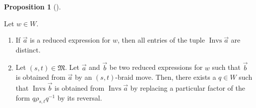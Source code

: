 \documentclass[numbers=enddot,12pt,final,onecolumn,notitlepage,abstracton]{scrartcl}%
\theoremstyle{definition}
\newtheorem{prop}[theo]{Proposition}
\newenvironment{proposition}[1][]
{\begin{prop}[#1]\begin{leftbar}}
{\end{leftbar}\end{prop}}
\begin{document}
\begin{proposition}
\label{prop.Invsles}Let $w\in W$.

\begin{enumerate}
\item[\textbf{(a)}] If $\overrightarrow{a}$ is a reduced expression for $w$,
then all entries of the tuple $\operatorname*{Invs}\overrightarrow{a}$ are distinct.

\item[\textbf{(b)}] Let $\left(  s,t\right)  \in\mathfrak{M}$. Let
$\overrightarrow{a}$ and $\overrightarrow{b}$ be two reduced expressions for
$w$ such that $\overrightarrow{b}$ is obtained from $\overrightarrow{a}$ by an
$\left(  s,t\right)  $-braid move. Then, there exists a $q\in W$ such that
$\operatorname*{Invs}\overrightarrow{b}$ is obtained from
$\operatorname*{Invs}\overrightarrow{a}$ by replacing a particular factor of
the form $q\rho_{s,t}q^{-1}$ by its reversal\footnotemark.
\end{enumerate}
\end{proposition}

\end{document}
